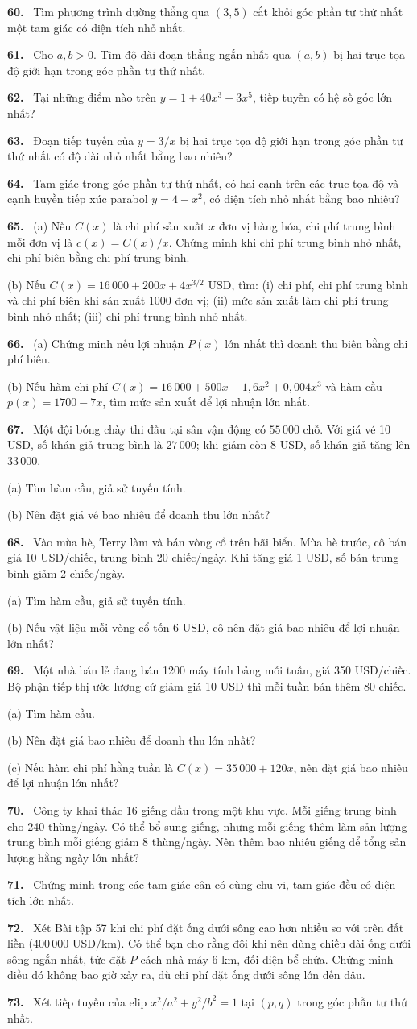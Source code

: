 \documentclass[12pt,a4paper]{article}
\newcommand{\bt}[1]{\par\smallskip\Needspace{5\baselineskip}\noindent\textbf{#1.}\ }
\begin{document}
\bt{60} Tìm phương trình đường thẳng qua $(3,5)$ cắt khỏi góc phần tư thứ nhất một tam giác có diện tích nhỏ nhất.
\bt{61} Cho $a,b>0$. Tìm độ dài đoạn thẳng ngắn nhất qua $(a,b)$ bị hai trục tọa độ giới hạn trong góc phần tư thứ nhất.
\bt{62} Tại những điểm nào trên $y=1+40x^3-3x^5$, tiếp tuyến có hệ số góc lớn nhất?
\bt{63} Đoạn tiếp tuyến của $y=3/x$ bị hai trục tọa độ giới hạn trong góc phần tư thứ nhất có độ dài nhỏ nhất bằng bao nhiêu?
\bt{64} Tam giác trong góc phần tư thứ nhất, có hai cạnh trên các trục tọa độ và cạnh huyền tiếp xúc parabol $y=4-x^2$, có diện tích nhỏ nhất bằng bao nhiêu?
\bt{65} (a) Nếu $C(x)$ là chi phí sản xuất $x$ đơn vị hàng hóa, chi phí trung bình mỗi đơn vị là $c(x)=C(x)/x$. Chứng minh khi chi phí trung bình nhỏ nhất, chi phí biên bằng chi phí trung bình.

(b) Nếu $C(x)=16\,000+200x+4x^{3/2}$ USD, tìm: (i) chi phí, chi phí trung bình và chi phí biên khi sản xuất 1000 đơn vị; (ii) mức sản xuất làm chi phí trung bình nhỏ nhất; (iii) chi phí trung bình nhỏ nhất.
\bt{66} (a) Chứng minh nếu lợi nhuận $P(x)$ lớn nhất thì doanh thu biên bằng chi phí biên.

(b) Nếu hàm chi phí $C(x)=16\,000+500x-1{,}6x^2+0{,}004x^3$ và hàm cầu $p(x)=1700-7x$, tìm mức sản xuất để lợi nhuận lớn nhất.
\bt{67} Một đội bóng chày thi đấu tại sân vận động có $55\,000$ chỗ. Với giá vé 10 USD, số khán giả trung bình là $27\,000$; khi giảm còn 8 USD, số khán giả tăng lên $33\,000$.

(a) Tìm hàm cầu, giả sử tuyến tính.

(b) Nên đặt giá vé bao nhiêu để doanh thu lớn nhất?
\bt{68} Vào mùa hè, Terry làm và bán vòng cổ trên bãi biển. Mùa hè trước, cô bán giá 10 USD/chiếc, trung bình 20 chiếc/ngày. Khi tăng giá 1 USD, số bán trung bình giảm 2 chiếc/ngày.

(a) Tìm hàm cầu, giả sử tuyến tính.

(b) Nếu vật liệu mỗi vòng cổ tốn 6 USD, cô nên đặt giá bao nhiêu để lợi nhuận lớn nhất?
\bt{69} Một nhà bán lẻ đang bán 1200 máy tính bảng mỗi tuần, giá 350 USD/chiếc. Bộ phận tiếp thị ước lượng cứ giảm giá 10 USD thì mỗi tuần bán thêm 80 chiếc.

(a) Tìm hàm cầu.

(b) Nên đặt giá bao nhiêu để doanh thu lớn nhất?

(c) Nếu hàm chi phí hằng tuần là $C(x)=35\,000+120x$, nên đặt giá bao nhiêu để lợi nhuận lớn nhất?
\bt{70} Công ty khai thác 16 giếng dầu trong một khu vực. Mỗi giếng trung bình cho 240 thùng/ngày. Có thể bổ sung giếng, nhưng mỗi giếng thêm làm sản lượng trung bình mỗi giếng giảm 8 thùng/ngày. Nên thêm bao nhiêu giếng để tổng sản lượng hằng ngày lớn nhất?
\bt{71} Chứng minh trong các tam giác cân có cùng chu vi, tam giác đều có diện tích lớn nhất.
\bt{72} Xét Bài tập 57 khi chi phí đặt ống dưới sông cao hơn nhiều so với trên đất liền ($400\,000$ USD/km). Có thể bạn cho rằng đôi khi nên dùng chiều dài ống dưới sông ngắn nhất, tức đặt $P$ cách nhà máy 6 km, đối diện bể chứa. Chứng minh điều đó không bao giờ xảy ra, dù chi phí đặt ống dưới sông lớn đến đâu.
\bt{73} Xét tiếp tuyến của elip $x^2/a^2+y^2/b^2=1$ tại $(p,q)$ trong góc phần tư thứ nhất.
\end{document}
